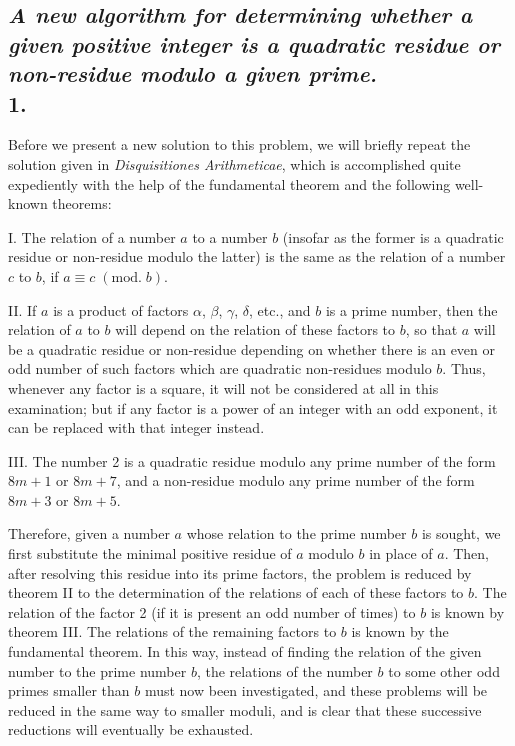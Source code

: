 \documentclass[twoside,12pt]{memoir}
\renewcommand{\pmod}[1]{\;(\textrm{mod.}\;#1)}
\begin{document}
\subsection*{{\scriptsize \textit{A new algorithm for determining whether a given positive integer is a quadratic residue or non-residue modulo a given prime.}}\\
1.}

Before we present a new solution to this problem, we will briefly repeat the solution given in \textit{Disquisitiones Arithmeticae}, which is accomplished quite expediently with the help of the fundamental theorem and the following well-known theorems:

I. The relation of a number \(a\) to a number \(b\) (insofar as the former is a quadratic residue or non-residue modulo the latter) is the same as the relation of a number \(c\) to \(b\), if \(a \equiv c\pmod{b}\).

II. If \(a\) is a product of factors \(\alpha\), \(\beta\), \(\gamma\), \(\delta\), etc{.}, and \(b\) is a prime number, then the relation of \(a\) to \(b\) will depend on the relation of these factors to \(b\), so that \(a\) will be a quadratic residue or non-residue depending on whether there is an even or odd number of such factors which are quadratic non-residues modulo \(b\). Thus, whenever any factor is a square, it will not be considered at all in this examination; but if any factor is a power of an integer with an odd exponent, it can be replaced with that integer instead.

III. The number 2 is a quadratic residue modulo any prime number of the form \(8m+1\) or \(8m+7\), and a non-residue modulo any prime number of the form \(8m+3\) or \(8m+5\).\pagebreak%

Therefore, given a number \(a\) whose relation to the prime number \(b\) is sought, we first substitute the minimal positive residue of \(a\) modulo \(b\) in place of \(a\). Then, after resolving this residue into its prime factors, the problem is reduced by theorem II to the determination of the relations of each of these factors to \(b\). The relation of the factor 2 (if it is present an odd number of times) to \(b\) is known by theorem III.  The relations of the remaining factors to \(b\) is known by the fundamental theorem. In this way, instead of finding the relation of the given number to the prime number \(b\), the relations of the number \(b\) to some other odd primes smaller than \(b\) must now been investigated, and these problems will be reduced in the same way to smaller moduli, and is clear that these successive reductions will eventually be exhausted.
\end{document}
